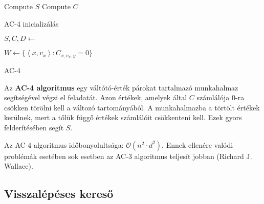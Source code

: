\begin{algorithm}[H]
    \DontPrintSemicolon
    {
        Compute $S$ \;
        Compute $C$ \;
        \;
    }
    \caption{AC-4 inicializálás}
\end{algorithm}

\begin{algorithm}[H]
    \DontPrintSemicolon
    {
        $S, C, D \gets$  \;

        $W \gets \{\left<x, v_x \right> : C_{x,v_x,y} = 0\} $

        \;
    }
    \caption{AC-4}
\end{algorithm}

Az {\bf AC-4 algoritmus} egy váltótó-érték párokat tartalmazó munkahalmaz
segítségével végzi el feladatát. Azon értékek, amelyek által $C$ számlálója $0$-ra
csökken törölni kell a változó tartományából. A munkahalmazba a törtölt értékek
kerülnek, mert a tőlük függő értékek számlálóit csökkenteni kell. Ezek gyors
felderítésében segít $S$.

\begin{megjegyzes}
    Az AC-4 algoritmus időbonyolultsága: $\mathcal{O}(n^2 \cdot d^2)$. Ennek ellenére valódi
    problémák esetében sok esetben az AC-3 algoritmus teljesít jobban (Richard
    J.  Wallace).
\end{megjegyzes}

\subsection{Visszalépéses kereső}
